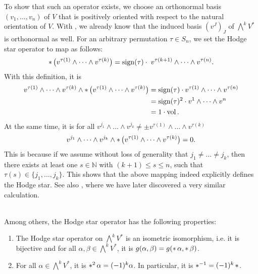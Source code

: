 To show that such an operator exists, we choose an orthonormal basis $(v_1,\dots,v_n)$ of 
$V$ that is positively oriented with respect to the natural orientation of $V$. With
, we already know that the induced basis $(v^J)_{J}$ of
$\bigwedge^kV^*$ is orthonormal as well. For an arbitrary permutation $\tau \in S_n$, we set the Hodge star
operator to map as follows:
\begin{align}
	\label{loc-theory:eq:explicit-hodge-star}
	\operatorname{\ast}\big(v^{\tau(1)}\wedge\dots\wedge v^{\tau(k)}\big) = \operatorname{sign}(\tau) \cdot \;v^{\tau(k+1)}
	\wedge\dots\wedge v^{\tau(n)}.
\end{align}
With this definition, it is
\begin{align*}
	v^{\tau(1)}\wedge\dots\wedge v^{\tau(k)} \wedge \operatorname{\ast}\big(v^{\tau(1)}\wedge\dots\wedge v^{\tau(k)}\big) &= \operatorname{sign}(\tau) \cdot v^{\tau(1)} \wedge\dots\wedge v^{\tau(n)}\\
	&= \operatorname{sign}(\tau)^2\cdot v^1\wedge \dots \wedge v^n \\&= 1 \cdot \operatorname{vol}.
\end{align*}
At the same time, it is for all $v^{j_1}\wedge\dots\wedge v^{j_k} \neq \pm v^{\tau(1)}\wedge\dots\wedge v^{\tau(k)}$
\begin{align*}
	v^{j_1}\wedge\dots\wedge v^{j_k} \wedge  \operatorname{\ast}\big(v^{\tau(1)}\wedge\dots\wedge
	v^{\tau(k)}\big) = 0.
\end{align*} This is because if we assume without loss of generality that $j_1\neq\dots\neq j_k$,
then there exists at least one $s\in\mathbb{N}$ with $(k+1) \leq s \leq n$, such that $\tau(s) \in \{j_1,\dots,j_k\}$.
This shows that the above mapping indeed explicitly defines the Hodge star. See also \cite[p.\,56f]{Schnell2012}, 
where we have later discovered a very similar calculation.
\begin{prop}\;\\
	\label{loc-theory:lm:property-hodge-star}
	Among others, the Hodge star operator has the following properties:
	\begin{enumerate}
		\item The Hodge star operator on $\bigwedge^kV^*$ is an isometric isomorphism, i.e. it is
		bijective and for all $\alpha, \beta \in \bigwedge^kV^*$, it is $g(\alpha,\beta) = g(\operatorname{\ast}\alpha,\operatorname{\ast}\beta)$.
		\item For all $\alpha \in \bigwedge^kV^*$, it is $\operatorname{\ast}^2\alpha = (-1)^k \alpha$. In particular, it is
		$\operatorname{\ast}^{-1} = (-1)^k \operatorname{\ast}$.
		\label{loc-theory:lm:property-hodge-star-one}
	\end{enumerate}
\end{prop}
